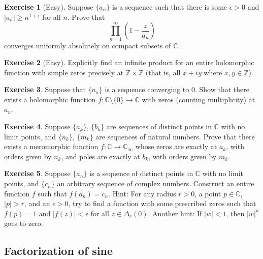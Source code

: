 \documentclass[12pt,openany]{book}
\newcommand{\sabs}[1]{\lvert {#1} \rvert}
\newcommand{\C}{{\mathbb{C}}}
\newcommand{\Z}{{\mathbb{Z}}}
\theoremstyle{plain}
\theoremstyle{remark}
\theoremstyle{definition}
\newenvironment{exbox}{%
    \def\FrameCommand{\vrule width 1pt \relax\hspace{10pt}}%
    \MakeFramed{\advance\hsize-\width\FrameRestore}%
}{%
    \endMakeFramed
}
\theoremstyle{exercise}
\newtheorem{exercise}{Exercise}[section]
\theoremstyle{example}
\begin{document}
\begin{exbox}
\begin{exercise}[Easy]
Suppose $\{ a_n \}$ is a sequence such that there is some $\epsilon>0$ and
$\sabs{a_n} \geq n^{1+\epsilon}$ for all $n$.  Prove that
\begin{equation*}
\prod_{n=1}^\infty
\left(1-\frac{z}{a_n} \right)
\end{equation*}
converges uniformly absolutely on compact subsets of $\C$.
\end{exercise}

\begin{exercise}[Easy]
Explicitly find an infinite product for an entire holomorphic function
with simple zeros precisely at $\Z \times \Z$ (that is,
all $x + iy$ where $x,y \in \Z$).
\end{exercise}

\begin{exercise}
Suppose that $\{ a_n \}$ is a sequence converging to $0$.  Show that there
exists a holomorphic function $f \colon \C \setminus \{ 0 \} \to \C$
with zeros (counting multiplicity) at $a_n$.
\end{exercise}

\begin{exercise}
Suppose $\{ a_k \}$, $\{ b_k \}$ are
sequences of distinct points in $\C$
with no limit points, and $\{ n_k \}$, $\{ m_k \}$ are sequences of
natural numbers.
Prove that
there exists a meromorphic function $f \colon \C \to \C_\infty$ whose
zeros are exactly at $a_k$, with orders given by $n_k$, and
poles are exactly at $b_k$, with orders given by $m_k$.
\end{exercise}

\begin{exercise}
Suppose $\{ a_n \}$ is a sequence of distinct points in $\C$
with no limit points, and $\{ c_n \}$ an arbitrary sequence of complex
numbers.  Construct an entire function $f$ such that $f(a_n) = c_n$.
Hint:  For any radius $r > 0$, a point $p \in \C$, $\sabs{p} > r$, and
an $\epsilon > 0$, try to find a function with some prescribed zeros
such that $f(p) =1$ and $\sabs{f(z)} < \epsilon$ for all $z \in \Delta_r(0)$.
Another hint:
If $\sabs{w} < 1$, then $\sabs{w}^n$ goes to zero.
\end{exercise}
\end{exbox}

\subsection{Factorization of sine}
\end{document}
